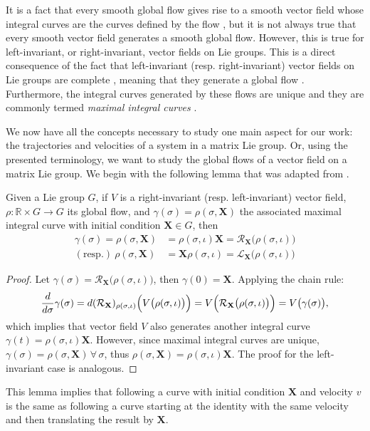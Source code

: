 It is a fact that every smooth global flow gives rise to a smooth vector field whose integral curves are the curves defined by the flow \citep[p. 211]{Lee2012}, but it is not always true that every smooth vector field generates a smooth global flow. However, this is true for left-invariant, or right-invariant, vector fields on Lie groups. This is a direct consequence of the fact that left-invariant (resp. right-invariant) vector fields on Lie groups are complete \citep[p. 570]{Gallier2020}, meaning that they generate a global flow \citep[p. 215]{Lee2012}. Furthermore, the integral curves generated by these flows are unique \citep[p. 18]{Duistermaat2012} and they are commonly termed \emph{maximal integral curves} \citep[p. 570]{Gallier2020}.

We now have all the concepts necessary to study one main aspect for our work: the trajectories and velocities of a system in a matrix Lie group. Or, using the presented terminology, we want to study the global flows of a vector field on a matrix Lie group. We begin with the following lemma that was adapted from \citet[p. 570]{Gallier2020}.
\begin{lemma}\label{lemma:lie-group-flow}
    Given a Lie group $G$, if $V$ is a right-invariant (resp. left-invariant) vector field, $\rho:\mathbb{R}\times G\to G$ its global flow, and $\gamma(\sigma)=\rho(\sigma, \mathbf{X})$ the associated maximal integral curve with initial condition $\mathbf{X}\in G$, then
    \begin{align*}
        \gamma(\sigma) = \rho(\sigma, \mathbf{X}) &=  \rho(\sigma, \iota)\mathbf{X} = \mathcal{R}_\mathbf{X}\bigl(\rho(\sigma, \iota)\bigr)\\
        (\text{resp.})\ \rho(\sigma, \mathbf{X}) &=  \mathbf{X}\rho(\sigma, \iota) = \mathcal{L}_\mathbf{X}\bigl(\rho(\sigma, \iota)\bigr)
    \end{align*}
\end{lemma}
\begin{proof}
    Let $\gamma(\sigma) = \mathcal{R}_\mathbf{X}\bigl(\rho(\sigma, \iota)\bigr)$, then $\gamma(0) = \mathbf{X}$. Applying the chain rule:
    \begin{align}
        \frac{d}{d\sigma}\gamma(\sigma) = d(\mathcal{R}_{\mathbf{X}})_{\rho(\sigma, \iota)}\Bigl(V\bigl(\rho(\sigma, \iota)\bigr)\Bigr) = V\Bigl(\mathcal{R}_{\mathbf{X}}\bigl(\rho(\sigma, \iota)\bigr)\Bigr) = V\bigl(\gamma(\sigma)\bigr),
    \end{align}
    which implies that vector field $V$ also generates another integral curve $\gamma(t)=\rho(\sigma, \iota)\mathbf{X}$. However, since maximal integral curves are unique, $\gamma(\sigma) = \rho(\sigma, \mathbf{X})\,\forall\, \sigma$, thus $\rho(\sigma, \mathbf{X}) = \rho(\sigma, \iota)\mathbf{X}$. The proof for the left-invariant case is analogous.
\end{proof}
This lemma implies that following a curve with initial condition $\mathbf{X}$ and velocity $v$ is the same as following a curve starting at the identity with the same velocity and then translating the result by $\mathbf{X}$.

